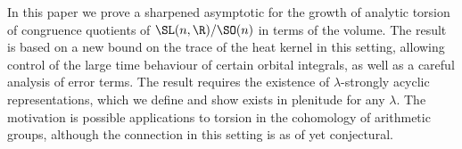 In this paper we prove a sharpened asymptotic for the growth of analytic torsion of congruence quotients of $\SL(n,\R)/\SO(n)$ in terms of the volume. The result is based on a new bound on the trace of the heat kernel in this setting, allowing control of the large time behaviour of certain orbital integrals, as well as a careful analysis of error terms. The result requires the existence of $\lambda$-strongly acyclic representations, which we define and show exists in plenitude for any $\lambda$. The motivation is possible applications to torsion in the cohomology of arithmetic groups, although the connection in this setting is as of yet conjectural.

